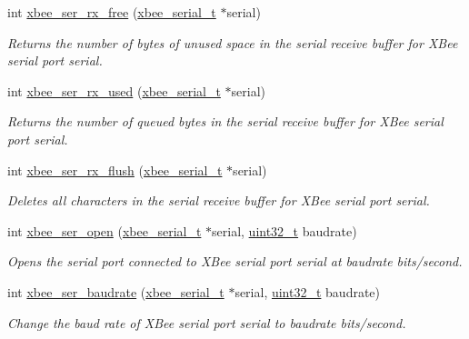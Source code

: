 \begin{DoxyCompactItemize}
int \hyperlink{group__xbee__serial_ga16fb431a1e66861439518e562431821f}{xbee\+\_\+ser\+\_\+rx\+\_\+free} (\hyperlink{structxbee__serial__t}{xbee\+\_\+serial\+\_\+t} $\ast$serial)
\begin{DoxyCompactList}\small\item\em Returns the number of bytes of unused space in the serial receive buffer for X\+Bee serial port {\itshape serial}. \end{DoxyCompactList}\item 
int \hyperlink{group__xbee__serial_ga43b8322771cc16b4130fa5330ad2242b}{xbee\+\_\+ser\+\_\+rx\+\_\+used} (\hyperlink{structxbee__serial__t}{xbee\+\_\+serial\+\_\+t} $\ast$serial)
\begin{DoxyCompactList}\small\item\em Returns the number of queued bytes in the serial receive buffer for X\+Bee serial port {\itshape serial}. \end{DoxyCompactList}\item 
int \hyperlink{group__xbee__serial_ga98a6d5ceb5e1445e8ef82ccaa65a8c15}{xbee\+\_\+ser\+\_\+rx\+\_\+flush} (\hyperlink{structxbee__serial__t}{xbee\+\_\+serial\+\_\+t} $\ast$serial)
\begin{DoxyCompactList}\small\item\em Deletes all characters in the serial receive buffer for X\+Bee serial port {\itshape serial}. \end{DoxyCompactList}\item 
int \hyperlink{group__xbee__serial_gaa615a221dd69c17ee2989c281f2bf04a}{xbee\+\_\+ser\+\_\+open} (\hyperlink{structxbee__serial__t}{xbee\+\_\+serial\+\_\+t} $\ast$serial, \hyperlink{group__hal__dos_ga09a1e304d66d35dd47daffee9731edaa}{uint32\+\_\+t} baudrate)
\begin{DoxyCompactList}\small\item\em Opens the serial port connected to X\+Bee serial port {\itshape serial} at {\itshape baudrate} bits/second. \end{DoxyCompactList}\item 
int \hyperlink{group__xbee__serial_gab3c12543a07e0669b672c5cab54b0926}{xbee\+\_\+ser\+\_\+baudrate} (\hyperlink{structxbee__serial__t}{xbee\+\_\+serial\+\_\+t} $\ast$serial, \hyperlink{group__hal__dos_ga09a1e304d66d35dd47daffee9731edaa}{uint32\+\_\+t} baudrate)
\begin{DoxyCompactList}\small\item\em Change the baud rate of X\+Bee serial port {\itshape serial} to {\itshape baudrate} bits/second. \end{DoxyCompactList}\item 

\end{DoxyCompactItemize}
